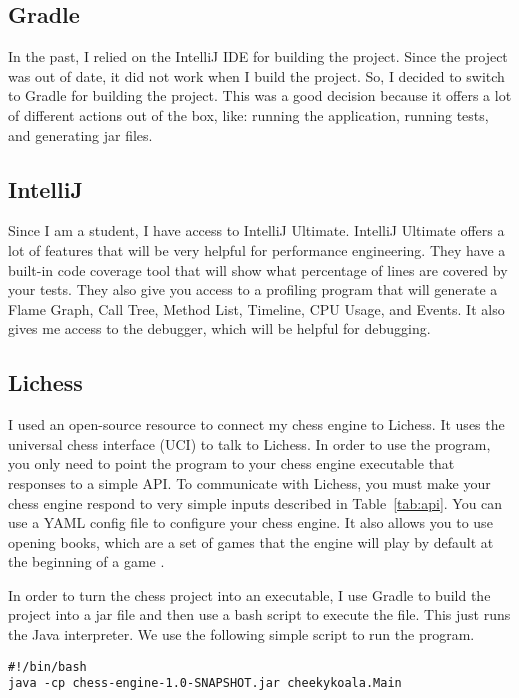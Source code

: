 \documentclass[sigconf]{acmart}
\begin{document}
\subsection{Gradle}
In the past, I relied on the IntelliJ IDE for building the project.
Since the project was out of date, it did not work when I build the project.
So, I decided to switch to Gradle for building the project.
This was a good decision because it offers a lot of different actions out of the box, like: running the application, running tests, and generating jar files.

\subsection{IntelliJ}
Since I am a student, I have access to IntelliJ Ultimate. IntelliJ Ultimate offers a lot of features that will be very helpful for performance engineering.
They have a built-in code coverage tool that will show what percentage of lines are covered by your tests.
They also give you access to a profiling program that will generate a Flame Graph, Call Tree, Method List, Timeline, CPU Usage, and Events.
It also gives me access to the debugger, which will be helpful for debugging.

\subsection{Lichess}
I used an open-source resource \cite{lichess-bot} to connect my chess engine to Lichess.
It uses the universal chess interface (UCI) \cite{uci} to talk to Lichess.
In order to use the program, you only need to point the program to your chess engine executable that responses to a simple API.
To communicate with Lichess, you must make your chess engine respond to very simple inputs described in Table~\ref{tab:api}.
You can use a YAML config file to configure your chess engine.
It also allows you to use opening books, which are a set of games that the engine will play by default at the beginning of a game \cite{pgn}.

In order to turn the chess project into an executable, I use Gradle to build the project into a jar file and then use a bash script to execute the file.
This just runs the Java interpreter.
We use the following simple script to run the program.
\begin{verbatim}
#!/bin/bash
java -cp chess-engine-1.0-SNAPSHOT.jar cheekykoala.Main
\end{verbatim}
\end{document}
